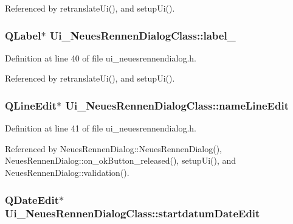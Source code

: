 Referenced by retranslateUi(), and setupUi().\hypertarget{class_ui___neues_rennen_dialog_class_173af6d532e17f3a4c167aa1f84a890e}{
\subsubsection[label\_\-4]{\setlength{\rightskip}{0pt plus 5cm}QLabel$\ast$ {\bf Ui\_\-NeuesRennenDialogClass::label\_}}}
\label{class_ui___neues_rennen_dialog_class_173af6d532e17f3a4c167aa1f84a890e}




Definition at line 40 of file ui\_\-neuesrennendialog.h.

Referenced by retranslateUi(), and setupUi().\hypertarget{class_ui___neues_rennen_dialog_class_9f58eb9025657715d9e2de3ee250be22}{
\subsubsection[nameLineEdit]{\setlength{\rightskip}{0pt plus 5cm}QLineEdit$\ast$ {\bf Ui\_\-NeuesRennenDialogClass::nameLineEdit}}}
\label{class_ui___neues_rennen_dialog_class_9f58eb9025657715d9e2de3ee250be22}




Definition at line 41 of file ui\_\-neuesrennendialog.h.

Referenced by NeuesRennenDialog::NeuesRennenDialog(), NeuesRennenDialog::on\_\-okButton\_\-released(), setupUi(), and NeuesRennenDialog::validation().\hypertarget{class_ui___neues_rennen_dialog_class_60dd7a101071bae85e8e5ba2c58d3428}{
\subsubsection[startdatumDateEdit]{\setlength{\rightskip}{0pt plus 5cm}QDateEdit$\ast$ {\bf Ui\_\-NeuesRennenDialogClass::startdatumDateEdit}}}
\label{class_ui___neues_rennen_dialog_class_60dd7a101071bae85e8e5ba2c58d3428}





